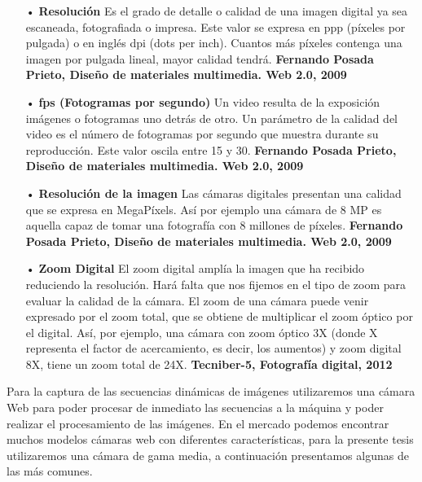 \begin{itemize}
\item[•] {\bf Resolución} \vskip 0.1cm
Es el grado de detalle o calidad de una imagen digital ya sea escaneada, fotografiada o impresa. Este valor se expresa en ppp (píxeles por pulgada) o en inglés dpi (dots per inch). Cuantos más píxeles contenga una imagen por pulgada lineal, mayor calidad tendrá.
\vskip 0.1cm
{\bf Fernando Posada Prieto, Diseño de materiales multimedia. Web 2.0, 2009}

\item[•] {\bf fps (Fotogramas por segundo)} \vskip 0.1cm
Un video resulta de la exposición imágenes o fotogramas uno detrás de otro. Un parámetro de la calidad del video es el número de fotogramas por segundo que muestra durante su reproducción. Este valor oscila entre 15 y 30. 
\vskip 0.1cm
{\bf Fernando Posada Prieto, Diseño de materiales multimedia. Web 2.0, 2009}

\item[•] {\bf Resolución de la imagen} \vskip 0.1cm
Las cámaras digitales presentan una calidad que se expresa en MegaPíxels. Así por ejemplo una cámara de 8 MP es aquella capaz de tomar una fotografía con 8 millones de píxeles. 
\vskip 0.1cm
{\bf Fernando Posada Prieto, Diseño de materiales multimedia. Web 2.0, 2009}

\item[•] {\bf Zoom Digital} \vskip 0.1cm
El zoom digital amplía la imagen que ha recibido reduciendo la resolución. Hará falta que nos fijemos en el tipo de zoom para evaluar la calidad de la cámara. El zoom de una cámara puede venir expresado por el zoom total, que se obtiene de multiplicar el zoom óptico por el digital. Así, por ejemplo, una cámara con zoom óptico 3X (donde X representa el factor de acercamiento, es decir, los aumentos) y zoom digital 8X, tiene un zoom total de 24X. 
\vskip 0.1cm
{\bf Tecniber-5, Fotografía digital, 2012}
\end{itemize}

Para la captura de las secuencias dinámicas de imágenes utilizaremos una cámara Web para poder procesar de inmediato las secuencias a la máquina y poder realizar el procesamiento de las imágenes. 
\vskip 0.1cm
En el mercado podemos encontrar muchos modelos cámaras web con diferentes características, para la presente tesis utilizaremos una cámara de gama media, a continuación presentamos algunas de las más comunes.

